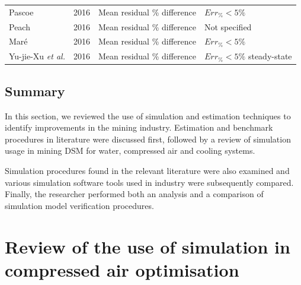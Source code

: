 \begin{table}[h]
\begin{tabular}{p{4cm}ccl}
 			Pascoe \cite{Pascoe2016Masters} 					& 2016 & Mean residual \% difference & $Err_{\%} <5\%$ \\	
			Peach \cite{Peach2016Masters}						& 2016 & Mean residual \% difference & Not specified\\
 			Maré \cite{Mare2016PhD} 							& 2016 & Mean residual \% difference & $Err_{\%} <5\%$  \\	
 			Yu-jie-Xu \textit{et al.} \cite{xu2016modeling}		& 2016 & Mean residual \% difference & $Err_{\%} <5\%$ steady-state \\
 			\hline
 		\end{tabular}  		
 		\label{table: Verification studies}
 	\end{table}
 
 	\subsection{Summary}
 	In this section, we reviewed the use of simulation and estimation techniques to identify improvements in the mining industry. Estimation and benchmark procedures in literature were discussed first, followed by a review of simulation usage in mining DSM for water, compressed air and cooling systems.
 	
 	Simulation procedures found in the relevant literature were also examined and various simulation software tools used in industry were subsequently compared. Finally, the researcher performed both an analysis and a comparison of simulation model verification procedures.
 	\clearpage
\section{Review of the use of simulation in compressed air optimisation}
\label{CompressorSimulation Literature} \label{simplfiedModels}
